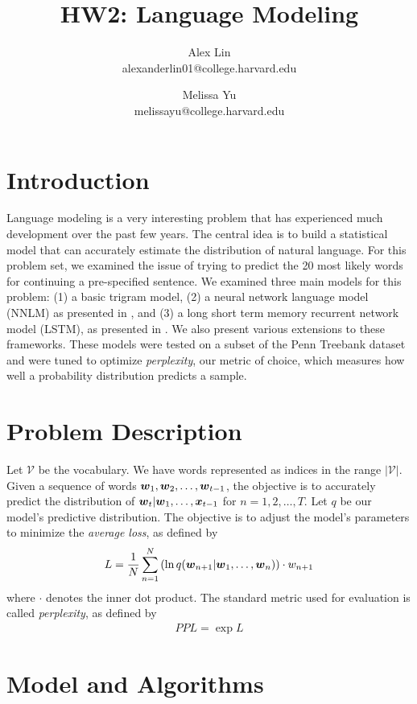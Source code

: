 \documentclass[11pt]{article}
\title{HW2: Language Modeling}
\author{Alex Lin \\ alexanderlin01@college.harvard.edu \and Melissa Yu \\ melissayu@college.harvard.edu }
\begin{document}
\maketitle{}
\section{Introduction}

Language modeling is a very interesting problem that has experienced much development over the past few years.  The central idea is to build a statistical model that can accurately estimate the distribution of natural language.  For this problem set, we examined the issue of trying to predict the 20 most likely words for continuing a pre-specified sentence.  We examined three main models for this problem: (1) a basic trigram model, (2) a neural network language model (NNLM) as presented in \cite{nnlm}, and (3) a long short term memory recurrent network model (LSTM), as presented in \cite{lstm}. We also present various extensions to these frameworks. These models were tested on a subset of the Penn Treebank dataset and were tuned to optimize \emph{perplexity}, our metric of choice, which measures how well a probability distribution predicts a sample.

\section{Problem Description}

Let $\mathcal{V}$ be the vocabulary.  We have words represented as indices in the range $\lvert \mathcal{V} \rvert$.  Given a sequence of words $\boldsymbol{w}_1, \boldsymbol{w}_2, \ldots, \boldsymbol{w}_{t-1}$, the objective is to accurately predict the distribution of $\boldsymbol{w}_t \vert \boldsymbol{w}_1, \ldots, \boldsymbol{x}_{t-1}$ for $n = 1, 2, \ldots, T$.  Let $q$ be our model's predictive distribution.  The objective is to adjust the model's parameters to minimize the \emph{average loss}, as defined by
\begin{align*}
L = \frac{1}{N} \sum_{n=1}^N \left(\ln q(\boldsymbol{w}_{n + 1} \vert \boldsymbol{w}_1, \ldots, \boldsymbol{w}_{n}) \right) \cdot w_{n+1} 
\end{align*}
where $\cdot$ denotes the inner dot product.  The standard metric used for evaluation is called \emph{perplexity}, as defined by
\begin{align*}
PPL = \exp L
\end{align*}

\section{Model and Algorithms}
\end{document}
